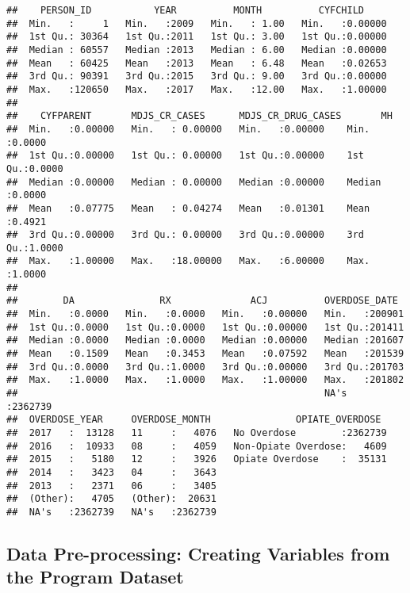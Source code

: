 \documentclass[]{article}
\begin{document}
\begin{verbatim}
##    PERSON_ID           YEAR          MONTH          CYFCHILD      
##  Min.   :     1   Min.   :2009   Min.   : 1.00   Min.   :0.00000  
##  1st Qu.: 30364   1st Qu.:2011   1st Qu.: 3.00   1st Qu.:0.00000  
##  Median : 60557   Median :2013   Median : 6.00   Median :0.00000  
##  Mean   : 60425   Mean   :2013   Mean   : 6.48   Mean   :0.02653  
##  3rd Qu.: 90391   3rd Qu.:2015   3rd Qu.: 9.00   3rd Qu.:0.00000  
##  Max.   :120650   Max.   :2017   Max.   :12.00   Max.   :1.00000  
##                                                                   
##    CYFPARENT       MDJS_CR_CASES      MDJS_CR_DRUG_CASES       MH        
##  Min.   :0.00000   Min.   : 0.00000   Min.   :0.00000    Min.   :0.0000  
##  1st Qu.:0.00000   1st Qu.: 0.00000   1st Qu.:0.00000    1st Qu.:0.0000  
##  Median :0.00000   Median : 0.00000   Median :0.00000    Median :0.0000  
##  Mean   :0.07775   Mean   : 0.04274   Mean   :0.01301    Mean   :0.4921  
##  3rd Qu.:0.00000   3rd Qu.: 0.00000   3rd Qu.:0.00000    3rd Qu.:1.0000  
##  Max.   :1.00000   Max.   :18.00000   Max.   :6.00000    Max.   :1.0000  
##                                                                          
##        DA               RX              ACJ          OVERDOSE_DATE    
##  Min.   :0.0000   Min.   :0.0000   Min.   :0.00000   Min.   :200901   
##  1st Qu.:0.0000   1st Qu.:0.0000   1st Qu.:0.00000   1st Qu.:201411   
##  Median :0.0000   Median :0.0000   Median :0.00000   Median :201607   
##  Mean   :0.1509   Mean   :0.3453   Mean   :0.07592   Mean   :201539   
##  3rd Qu.:0.0000   3rd Qu.:1.0000   3rd Qu.:0.00000   3rd Qu.:201703   
##  Max.   :1.0000   Max.   :1.0000   Max.   :1.00000   Max.   :201802   
##                                                      NA's   :2362739  
##  OVERDOSE_YEAR     OVERDOSE_MONTH               OPIATE_OVERDOSE   
##  2017   :  13128   11     :   4076   No Overdose        :2362739  
##  2016   :  10933   08     :   4059   Non-Opiate Overdose:   4609  
##  2015   :   5180   12     :   3926   Opiate Overdose    :  35131  
##  2014   :   3423   04     :   3643                                
##  2013   :   2371   06     :   3405                                
##  (Other):   4705   (Other):  20631                                
##  NA's   :2362739   NA's   :2362739
\end{verbatim}

\subsection{Data Pre-processing: Creating Variables from the Program
Dataset}\label{data-pre-processing-creating-variables-from-the-program-dataset}
\end{document}
